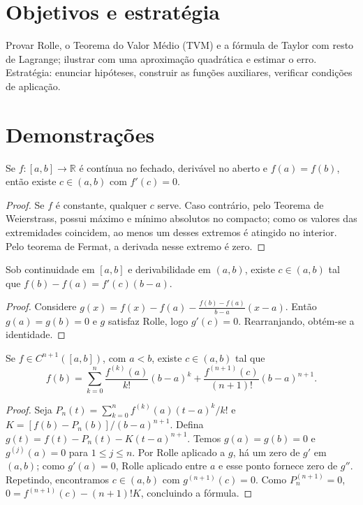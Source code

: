 \documentclass[11pt,a4paper]{article}
\begin{document}
\section{Objetivos e estratégia}
Provar Rolle, o Teorema do Valor Médio (TVM) e a fórmula de Taylor com resto de Lagrange; ilustrar com uma aproximação quadrática e estimar o erro. Estratégia: enunciar hipóteses, construir as funções auxiliares, verificar condições de aplicação.
\section{Demonstrações}
\begin{lema}[Rolle]
Se $f:[a,b]\to\mathbb R$ é contínua no fechado, derivável no aberto e $f(a)=f(b)$, então existe $c\in(a,b)$ com $f'(c)=0$.
\end{lema}
\begin{proof}
Se $f$ é constante, qualquer $c$ serve. Caso contrário, pelo Teorema de Weierstrass, possui máximo e mínimo absolutos no compacto; como os valores das extremidades coincidem, ao menos um desses extremos é atingido no interior. Pelo teorema de Fermat, a derivada nesse extremo é zero.
\end{proof}
\begin{teorema}
Sob continuidade em $[a,b]$ e derivabilidade em $(a,b)$, existe $c\in(a,b)$ tal que $f(b)-f(a)=f'(c)(b-a)$.
\end{teorema}
\begin{proof}
Considere $g(x)=f(x)-f(a)-\frac{f(b)-f(a)}{b-a}(x-a)$. Então $g(a)=g(b)=0$ e $g$ satisfaz Rolle, logo $g'(c)=0$. Rearranjando, obtém-se a identidade.
\end{proof}
\begin{teorema}
Se $f\in C^{n+1}([a,b])$, com $a<b$, existe $c\in(a,b)$ tal que
\[
f(b)=\sum_{k=0}^n\frac{f^{(k)}(a)}{k!}(b-a)^k
+\frac{f^{(n+1)}(c)}{(n+1)!}(b-a)^{n+1}.
\]
\end{teorema}
\begin{proof}
Seja $P_n(t)=\sum_{k=0}^n f^{(k)}(a)(t-a)^k/k!$ e
$K=[f(b)-P_n(b)]/(b-a)^{n+1}$. Defina
$g(t)=f(t)-P_n(t)-K(t-a)^{n+1}$. Temos $g(a)=g(b)=0$ e $g^{(j)}(a)=0$ para $1\le j\le n$. Por Rolle aplicado a $g$, há um zero de $g'$ em $(a,b)$; como $g'(a)=0$, Rolle aplicado entre $a$ e esse ponto fornece zero de $g''$. Repetindo, encontramos $c\in(a,b)$ com $g^{(n+1)}(c)=0$. Como $P_n^{(n+1)}=0$,
$0=f^{(n+1)}(c)-(n+1)!K$, concluindo a fórmula.
\end{proof}
\end{document}
